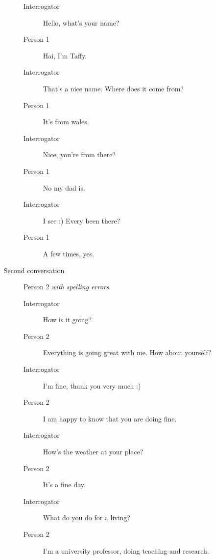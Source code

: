 \begin{itemize}
\begin{description}
\begin{description}
               \item [Interrogator] Hello, what's your name?
               \item [Person 1] Hai, I'm Taffy.
               \item [Interrogator] That's a nice name. Where does it come from?
               \item [Person 1] It's from wales.
               \item [Interrogator] Nice, you're from there?
               \item [Person 1] No my dad is.
               \item [Interrogator] I see :) Every been there?
               \item [Person 1] A few times, yes.
            \end{description}
         \item [Second conversation] Person 2 \textit{with spelling errors}
            \begin{description}
               \item [Interrogator] How is it going?
               \item [Person 2] Everything is going great with me. How about yourself?
               \item [Interrogator] I'm fine, thank you very much :)
               \item [Person 2] I am happy to know that you are doing fine.
               \item [Interrogator] How's the weather at your place?
               \item [Person 2] It's a fine day.
               \item [Interrogator] What do you do for a living?
               \item [Person 2] I'm a university professor, doing teaching and research.
            \end{description}
      \end{description}


\end{itemize}
